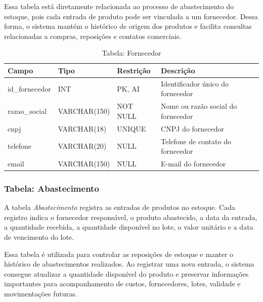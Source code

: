 Essa tabela está diretamente relacionada ao processo de abastecimento do estoque, pois cada entrada de produto pode ser vinculada a um fornecedor. Dessa forma, o sistema mantém o histórico de origem dos produtos e facilita consultas relacionadas a compras, reposições e contatos comerciais.

\begin{table}[H]
\centering
\begin{tabular}{|p{3cm}|p{3cm}|p{3cm}|p{5cm}|}
\hline
\textbf{Campo} & \textbf{Tipo} & \textbf{Restrição} & \textbf{Descrição} \\ \hline
id\_fornecedor & INT & PK, AI & Identificador único do fornecedor \\ \hline
razao\_social & VARCHAR(150) & NOT NULL & Nome ou razão social do fornecedor \\ \hline
cnpj & VARCHAR(18) & UNIQUE & CNPJ do fornecedor \\ \hline
telefone & VARCHAR(20) & NULL & Telefone de contato do fornecedor \\ \hline
email & VARCHAR(150) & NULL & E-mail do fornecedor \\ \hline
\end{tabular}
\caption{Tabela: Fornecedor}
\end{table}

\subsubsection{Tabela: Abastecimento}

A tabela \textit{Abastecimento} registra as entradas de produtos no estoque. Cada registro indica o fornecedor responsável, o produto abastecido, a data da entrada, a quantidade recebida, a quantidade disponível no lote, o valor unitário e a data de vencimento do lote.

Essa tabela é utilizada para controlar as reposições de estoque e manter o histórico de abastecimentos realizados. Ao registrar uma nova entrada, o sistema consegue atualizar a quantidade disponível do produto e preservar informações importantes para acompanhamento de custos, fornecedores, lotes, validade e movimentações futuras.

